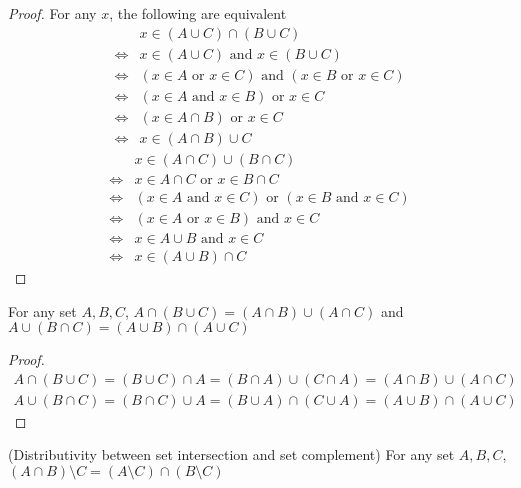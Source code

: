 \begin{proof}
    For any $x$, the following are equivalent 
    \begin{align*}
        & x\in (A\cup C)\cap(B\cup C)\\
        \Leftrightarrow & x\in (A\cup C) \text{ and }x\in(B\cup C)\\
        \Leftrightarrow & (x\in A\text{ or }x\in C)\text{ and }(x\in B\text{ or }x\in C)\\
        \Leftrightarrow & (x\in A \text{ and }x\in B)\text{ or }x\in C\\
        \Leftrightarrow & (x\in A\cap B)\text{ or }x\in C\\
        \Leftrightarrow & x\in(A\cap B)\cup C
    \end{align*}
    \begin{align*}
        & x\in (A\cap C)\cup (B\cap C)\\
        \Leftrightarrow & x\in A\cap C \text{ or }x\in B\cap C\\
        \Leftrightarrow & (x\in A\text{ and }x\in C)\text{ or }(x\in B\text{ and }x\in C)\\
        \Leftrightarrow & (x\in A\text{ or }x\in B) \text{ and }x\in C\\
        \Leftrightarrow & x\in A\cup B \text{ and }x\in C\\
        \Leftrightarrow & x\in(A\cup B)\cap C
    \end{align*}
\end{proof}
\begin{cor}
    {For any set $A,B,C$, $A\cap (B\cup C) = (A\cap B)\cup  (A\cap C)$ and $A\cup(B\cap C) = (A\cup B)\cap (A\cup C)$}
\end{cor}
\begin{proof}
    \begin{gather*}
        A\cap (B\cup C) = (B\cup C)\cap A = (B\cap A)\cup (C\cap A) = (A\cap B)\cup (A\cap C)\\
        A\cup (B\cap C) = (B\cap C)\cup A = (B\cup A)\cap (C\cup A) = (A\cup B)\cap (A\cup C)
    \end{gather*}
\end{proof}
\begin{prop}
    {(Distributivity between set intersection and set complement) For any set $A,B,C$, $(A\cap B)\setminus C = (A\setminus C) \cap (B\setminus C)$}
\end{prop}
